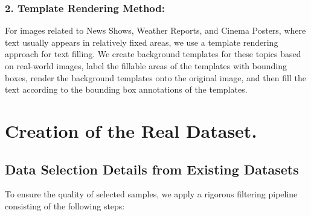 \subsubsection{2. Template Rendering Method: }
For images related to News Shows, Weather Reports, and Cinema Posters, where text usually appears in relatively fixed areas, we use a template rendering approach for text filling. We create background templates for these topics based on real-world images, label the fillable areas of the templates with bounding boxes, render the background templates onto the original image, and then fill the text according to the bounding box annotations of the templates.



\clearpage


\section{Creation of the Real Dataset.}



\subsection{Data Selection Details from Existing Datasets}
\label{sec:appendix_data_selection}
To ensure the quality of selected samples, we apply a rigorous filtering pipeline consisting of the following steps:

